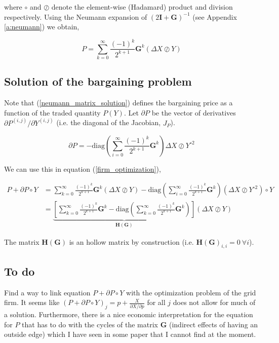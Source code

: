 \documentclass[american]{scrartcl}
\newcommand{\matr}[1]{\bm{#1}}
\newcommand{\diag}{\text{diag}}
\begin{document}
where $\circ$ and $\oslash$ denote the element-wise (Hadamard) product and division respectively. Using the Neumann expansion of $(2\matr{I} + \matr{G})^{-1}$ (see Appendix \ref{a:neumann}) we obtain,

\begin{equation} \label{neumann_matrix_solution}
	P = \sum^{\infty}_{k=0}\frac{(-1)^k}{2^{k+1}} \matr{G}^k (\Delta X \oslash Y)
\end{equation}

\subsection{Solution of the bargaining problem}

Note that (\ref{neumann_matrix_solution}) defines the bargaining price as a function of the traded quantity $P(Y)$. Let $\partial P$ be the vector of derivatives $\partial P^{(i, j)} / \partial Y^{(i, j)}$ (i.e. the diagonal of the Jacobian, $J_P$).

\begin{equation}
	\partial P = - \diag\left(\sum^\infty_{i=0} \frac{(-1)^k}{2^{k+1}} \matr{G}^k\right) \Delta X \oslash Y^{\circ 2}
\end{equation}

We can use this in equation (\ref{firm_optimization}),

\begin{equation}
	\begin{split}
		P + \partial P \circ Y &= \sum^{\infty}_{k=0}\frac{(-1)^k}{2^{k+1}} \matr{G}^k (\Delta X \oslash Y) - \diag\left(\sum^\infty_{i=0} \frac{(-1)^k}{2^{k+1}} \matr{G}^k\right) (\Delta X \oslash Y^{\circ 2}) \circ Y \\
		&= \underbrace{\left[ \sum^{\infty}_{k=0}\frac{(-1)^k}{2^{k+1}} \matr{G}^k - \diag \left( \sum^{\infty}_{k=0}\frac{(-1)^k}{2^{k+1}} \matr{G}^k \right) \right]}_{\matr{H(G)}} (\Delta X \oslash Y)
	\end{split}
\end{equation}

The matrix $\matr{H(G)}$ is an hollow matrix by construction (i.e. $\matr{H(G)}_{i, i} = 0 \ \forall i$).

\subsection{To do}

Find a way to link equation $P + \partial P \circ Y$ with the optimization problem of the grid firm. It seems like $(P + \partial P \circ Y)_j = p + \frac{X}{\partial X / \partial p}$ for all $j$ does not allow for much of a solution. Furthermore, there is a nice economic interpretation for the equation for $P$ that has to do with the cycles of the matrix $\matr{G}$ (indirect effects of having an outside edge) which I have seen in some paper that I cannot find at the moment.
\end{document}
